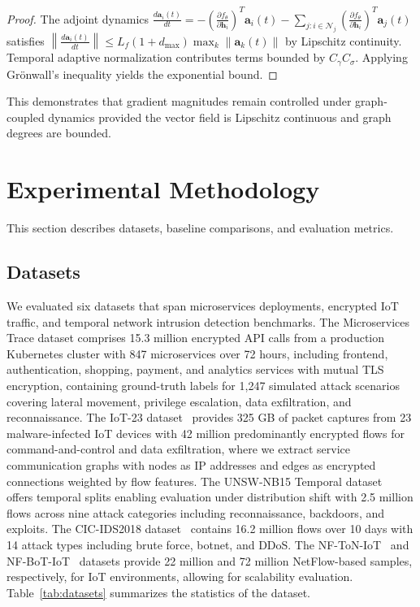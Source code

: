 \documentclass[lettersize,journal]{IEEEtran}
\begin{document}
\begin{proof}
The adjoint dynamics $\frac{d\mathbf{a}_i(t)}{dt} = -\left(\frac{\partial f_\theta}{\partial \mathbf{h}_i}\right)^T \mathbf{a}_i(t) - \sum_{j : i \in \mathcal{N}_j} \left(\frac{\partial f_\theta}{\partial \mathbf{h}_i}\right)^T \mathbf{a}_j(t)$ satisfies $\left\|\frac{d\mathbf{a}_i(t)}{dt}\right\| \leq L_f (1 + d_{\max}) \max_k \|\mathbf{a}_k(t)\|$ by Lipschitz continuity. Temporal adaptive normalization contributes terms bounded by $C_\gamma C_\sigma$. Applying Grönwall's inequality yields the exponential bound.
\end{proof}

This demonstrates that gradient magnitudes remain controlled under graph-coupled dynamics provided the vector field is Lipschitz continuous and graph degrees are bounded.

\section{Experimental Methodology}
\label{sec:experiments}

This section describes datasets, baseline comparisons, and evaluation metrics.

\subsection{Datasets}

We evaluated six datasets that span microservices deployments, encrypted IoT traffic, and temporal network intrusion detection benchmarks. The Microservices Trace dataset comprises 15.3 million encrypted API calls from a production Kubernetes cluster with 847 microservices over 72 hours, including frontend, authentication, shopping, payment, and analytics services with mutual TLS encryption, containing ground-truth labels for 1,247 simulated attack scenarios covering lateral movement, privilege escalation, data exfiltration, and reconnaissance. The IoT-23 dataset~\cite{garcia2020iot23} provides 325 GB of packet captures from 23 malware-infected IoT devices with 42 million predominantly encrypted flows for command-and-control and data exfiltration, where we extract service communication graphs with nodes as IP addresses and edges as encrypted connections weighted by flow features. The UNSW-NB15 Temporal dataset~\cite{moustafa2015unsw} offers temporal splits enabling evaluation under distribution shift with 2.5 million flows across nine attack categories including reconnaissance, backdoors, and exploits. The CIC-IDS2018 dataset~\cite{sharafaldin2018cic} contains 16.2 million flows over 10 days with 14 attack types including brute force, botnet, and DDoS. The NF-ToN-IoT~\cite{sarhan2022nf} and NF-BoT-IoT~\cite{sarhan2021netflow} datasets provide 22 million and 72 million NetFlow-based samples, respectively, for IoT environments, allowing for scalability evaluation. Table~\ref{tab:datasets} summarizes the statistics of the dataset.
\end{document}

